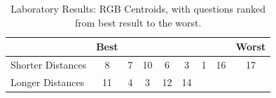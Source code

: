 %
\begin{table}[htbp]
  \centering
  \begin{tabular}{@{}lcccccccc@{}}
  \toprule
      & \multicolumn{1}{l}{Best}                        & \multicolumn{1}{l}{}                            & \multicolumn{1}{l}{}                           & \multicolumn{1}{l}{}                            & \multicolumn{1}{l}{}                            & \multicolumn{1}{l}{}                            & \multicolumn{1}{l}{}                            & \multicolumn{1}{l}{Worst}                       \\ \midrule
  \multicolumn{1}{l|}{Shorter Distances} & \multicolumn{1}{c||}{\cellcolor[HTML]{FF0000}8} & \multicolumn{1}{c||}{\cellcolor[HTML]{0000FF}7}  & \multicolumn{1}{c||}{\cellcolor[HTML]{0080FF}10} & \multicolumn{1}{c||}{\cellcolor[HTML]{FF8000}6}  & \multicolumn{1}{c||}{\cellcolor[HTML]{80FF00}3} & \multicolumn{1}{c||}{\cellcolor[HTML]{FFFF00}1} & \multicolumn{1}{c||}{\cellcolor[HTML]{FF007F}16} & \multicolumn{1}{c|}{\cellcolor[HTML]{00FF00}17} \\ \midrule
  \multicolumn{1}{l|}{Longer Distances}  & \multicolumn{1}{c||}{\cellcolor[HTML]{FF8000}11} & \multicolumn{1}{c||}{\cellcolor[HTML]{7F00FF}4} & \multicolumn{1}{c||}{\cellcolor[HTML]{80FF00}3} & \multicolumn{1}{c||}{\cellcolor[HTML]{80FF00}12} & \multicolumn{1}{c|}{\cellcolor[HTML]{8000FF}14} & & & \\ \bottomrule
  \end{tabular}
  \caption[Laboratory Results: RGB Centroids]{Laboratory Results: RGB Centroids, with questions ranked from best result to the worst.}
  \label{table:centroids_rgbresults}
\end{table}
%
